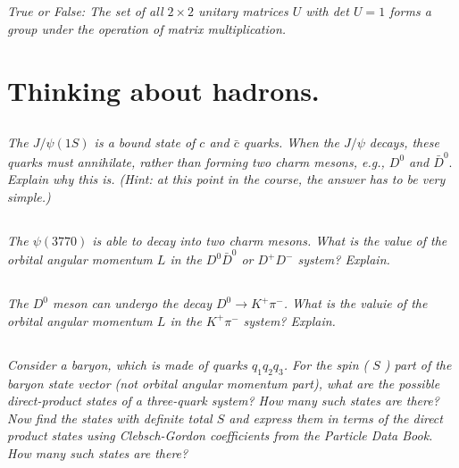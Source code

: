 \documentclass{article}
\begin{document}
\subsection{}
\textit{ True or False: The set of all $2 \times 2$ unitary matrices $U$ with det $U=1$ forms a group under the operation of matrix multiplication.}


\newpage


\section{Thinking about hadrons.}
\subsection{}
\textit{The $J / \psi(1 S)$ is a bound state of $c$ and $\bar{c}$ quarks. When the $J / \psi$ decays, these quarks must annihilate, rather than forming two charm mesons, e.g., $D^{0}$ and $\bar{D}^{0} .$ Explain why this is. (Hint: at this point in the course, the answer has to be very simple.) }



\subsection{}
\textit{The $\psi(3770)$ is able to decay into two charm mesons. What is the value of the orbital angular momentum $L$ in the $D^{0} \bar{D}^{0}$ or $D^{+} D^{-}$ system? Explain. }      



\subsection{}
\textit{The $D^{0}$ meson can undergo the decay $D^{0} \rightarrow K^{+} \pi^{-}$. What is the valuie of the orbital angular momentum $L$ in the $K^{+} \pi^{-}$ system? Explain.}



\subsection{}
\textit{Consider a baryon, which is made of quarks $q_{1} q_{2} q_{3}$. For the spin ( $S$ ) part of the baryon state vector (not orbital angular momentum part), what are the possible direct-product states of a three-quark system? How many such states are there? Now find the states with definite total $S$ and express them in terms of the direct product states using Clebsch-Gordon coefficients from the Particle Data Book. How many such states are there?}
\end{document}
